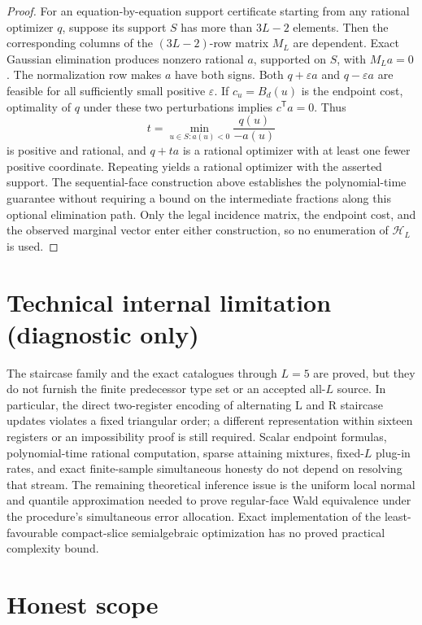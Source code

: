 \documentclass{article}
\begin{document}
\begin{proof}
For an equation-by-equation support certificate starting from any rational optimizer \(q\), suppose its support \(S\) has more than \(3L-2\) elements.  Then the corresponding columns of the \((3L-2)\)-row matrix \(M_L\) are dependent.  Exact Gaussian elimination produces nonzero rational \(a\), supported on \(S\), with \(M_La=0\).  The normalization row makes \(a\) have both signs.  Both \(q+\varepsilon a\) and \(q-\varepsilon a\) are feasible for all sufficiently small positive \(\varepsilon\).  If \(c_u=B_d(u)\) is the endpoint cost, optimality of \(q\) under these two perturbations implies \(c^{\mathsf T}a=0\).  Thus
\[
 t=\min_{u\in S:a(u)<0}\frac{q(u)}{-a(u)}
\]
is positive and rational, and \(q+ta\) is a rational optimizer with at least one fewer positive coordinate.  Repeating yields a rational optimizer with the asserted support.  The sequential-face construction above establishes the polynomial-time guarantee without requiring a bound on the intermediate fractions along this optional elimination path.  Only the legal incidence matrix, the endpoint cost, and the observed marginal vector enter either construction, so no enumeration of \(\mathcal H_L\) is used.
\end{proof}

\section*{Technical internal limitation (diagnostic only)}

The staircase family and the exact catalogues through \(L=5\) are proved, but they do not furnish the finite predecessor type set or an accepted all-\(L\) source.  In particular, the direct two-register encoding of alternating \(\mathrm L\) and \(\mathrm R\) staircase updates violates a fixed triangular order; a different representation within sixteen registers or an impossibility proof is still required.  Scalar endpoint formulas, polynomial-time rational computation, sparse attaining mixtures, fixed-\(L\) plug-in rates, and exact finite-sample simultaneous honesty do not depend on resolving that stream.  The remaining theoretical inference issue is the uniform local normal and quantile approximation needed to prove regular-face Wald equivalence under the procedure's simultaneous error allocation.  Exact implementation of the least-favourable compact-slice semialgebraic optimization has no proved practical complexity bound.

\section{Honest scope}
\end{document}
